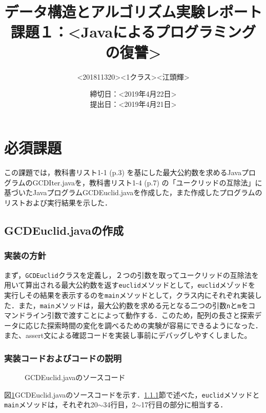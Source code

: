 \documentclass[10.5pt,a4paper]{jsarticle}
\title{データ構造とアルゴリズム実験レポート\\課題１：\textless Javaによるプログラミングの復讐\textgreater}
\author{\textless 201811320\textgreater \textless 1クラス\textgreater \textless 江頭輝\textgreater}
\date{締切日：\textless 2019年4月22日\textgreater\\提出日：\textless 2019年4月21日\textgreater}
\newcommand{\figref}[1]{図\ref{#1}}
\newcommand{\secref}[1]{\ref{#1}節}
\begin{document}
\maketitle

\section{必須課題}

この課題では，教科書リスト1-1 (p.3) を基にした最大公約数を求めるJavaプログラムのGCDIter.javaを，教科書リスト1-4 (p.7) の「ユークリッドの互除法」に基づいたJavaプログラムGCDEuclid.javaを作成した，また作成したプログラムのリストおよび実行結果を示した．

\subsection{GCDEuclid.javaの作成}
\subsubsection{実装の方針}\label{sec:ls_impl_policy}
まず，\texttt{GCDEuclid}クラスを定義し，２つの引数を取ってユークリッドの互除法を用いて算出される最大公約数を返す\texttt{euclid}メソッドとして，\texttt{euclid}メゾッドを実行しその結果を表示するのを\texttt{main}メソッドとして，クラス内にそれぞれ実装した．また，\texttt{main}メソッドは，最大公約数を求める元となる二つの引数\texttt{n}と\texttt{m}をコマンドライン引数で渡すことによって動作する．このため，配列の長さと探索データに応じた探索時間の変化を調べるための実験が容易にできるようになった．また、assert文による確認コードを実装し事前にデバッグしやすくしました。

\subsubsection{実装コードおよびコードの説明}\label{sec:ls_impl_code}

\begin{figure}[t]
  \begin{center}
   
   \caption{GCDEuclid.javaのソースコード}
   \label{code:GCDEuclid}
  \end{center}
 \end{figure}

\figref{code:GCDEuclid}GCDEuclid.javaのソースコードを示す．\secref{sec:ls_impl_policy}で述べた，\texttt{euclid}メソッドと\texttt{main}メソッドは，それぞれ20$\sim$34行目，2$\sim$17行目の部分に相当する．
\end{document}
